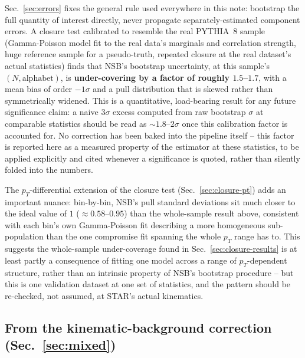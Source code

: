 \documentclass[11pt]{article}
\begin{document}
Sec.~\ref{sec:errors} fixes the general rule used everywhere in this
note: bootstrap the full quantity of interest directly, never propagate
separately-estimated component errors. A closure test calibrated to
resemble the real PYTHIA~8 sample (Gamma-Poisson model fit to the real
data's marginals and correlation strength, huge reference sample for a
pseudo-truth, repeated closure at the real dataset's actual statistics)
finds that NSB's bootstrap uncertainty, at this sample's
$(N,\text{alphabet})$, is \textbf{under-covering by a factor of roughly
$1.5$--$1.7$}, with a mean bias of order $-1\sigma$ and a pull
distribution that is skewed rather than symmetrically widened. This is a
quantitative, load-bearing result for any future significance claim: a
naive $3\sigma$ excess computed from raw bootstrap $\sigma$ at comparable
statistics should be read as $\sim\!1.8$--$2\sigma$ once this calibration
factor is accounted for. No correction has been baked into the pipeline
itself -- this factor is reported here as a measured property of the
estimator at these statistics, to be applied explicitly and cited
whenever a significance is quoted, rather than silently folded into the
numbers.

The $p_T$-differential extension of the closure test
(Sec.~\ref{sec:closure-pt}) adds an important nuance: bin-by-bin, NSB's
pull standard deviations sit much closer to the ideal value of $1$
($\approx0.58$--$0.95$) than the whole-sample result above, consistent
with each bin's own Gamma-Poisson fit describing a more homogeneous
sub-population than the one compromise fit spanning the whole $p_T$
range has to. This suggests the whole-sample under-coverage found in
Sec.~\ref{sec:closure-results} is at least partly a consequence of
fitting one model across a range of $p_T$-dependent structure, rather
than an intrinsic property of NSB's bootstrap procedure -- but this is
one validation dataset at one set of statistics, and the pattern should
be re-checked, not assumed, at STAR's actual kinematics.

\subsection{From the kinematic-background correction (Sec.~\ref{sec:mixed})}
\end{document}
